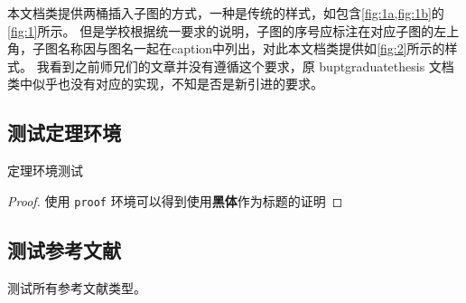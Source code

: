 本文档类提供两桶插入子图的方式，一种是传统的样式，如包含\cref{fig:1a,fig:1b}的\cref{fig:1}所示。
但是学校根据统一要求的说明，子图的序号应标注在对应子图的左上角，子图名称因与图名一起在caption中列出，对此本文档类提供如\cref{fig:2}所示的样式。
我看到之前师兄们的文章并没有遵循这个要求，原 buptgraduatethesis 文档类中似乎也没有对应的实现，不知是否是新引进的要求。

\subsection{测试定理环境}
\begin{theorem}[定理名称]
    定理环境测试
\end{theorem}

\begin{proof}
    使用 \texttt{proof} 环境可以得到使用\textbf{黑体}作为标题的证明
\end{proof}

\subsection{测试参考文献}
测试所有参考文献类型\cite{CITATION_BOOK,CITATION_ARTICLE,CITATION_PROCEEDINGS,CITATION_INPROCEEDINGS,CITATION_TECHREPORT,CITATION_STANDARD,CITATION_PATENT,CITATION_NEWSPAPER,CITATION_ELECTRONIC}。

\chapterbib
